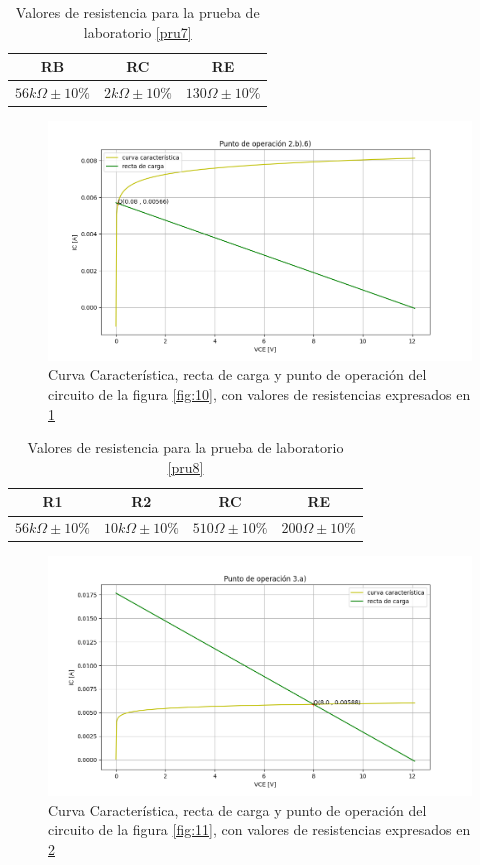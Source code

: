 \documentclass[10pt, a4paper]{article}
\begin{document}
    \newpage

    \begin{table}[h!]
        \centering
        \caption{Valores de resistencia para la prueba de laboratorio \ref{pru7}}
        \label{tab:2b6}
        \begin{tabular}{|c|c|c|} \hline
            RB & RC & RE \\ \hline
            $56k\Omega \pm 10\%$ & $2k\Omega \pm 10\%$ & $130\Omega \pm 10\%$ \\ \hline
        \end{tabular}
    \end{table}

    \begin{figure}[h!]
        \centering
        \includegraphics[height=5cm\textwidth]{2b6.png}
        \caption{Curva Característica, recta de carga y punto de operación del circuito de la figura \ref{fig:10}, con valores de resistencias expresados en \ref{tab:2b6}}
        \label{fig:2b6}
    \end{figure}

    \begin{table}[h!]
        \centering
        \caption{Valores de resistencia para la prueba de laboratorio \ref{pru8}}
        \label{tab:3a}
        \begin{tabular}{|c|c|c|c|} \hline
            R1 & R2 & RC & RE \\ \hline
            $56k\Omega \pm 10\%$ & $10k\Omega \pm 10\%$ & $510\Omega \pm 10\%$ & $200\Omega \pm 10\%$ \\ \hline
        \end{tabular}
    \end{table}

    \begin{figure}[h!]
        \centering
        \includegraphics[height=5cm\textwidth]{3a.png}
        \caption{Curva Característica, recta de carga y punto de operación del circuito de la figura \ref{fig:11}, con valores de resistencias expresados en \ref{tab:3a}}
        \label{fig:3a}
    \end{figure}
\end{document}
